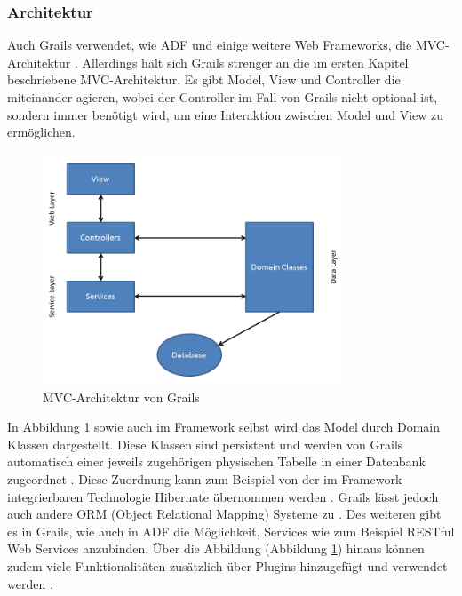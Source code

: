 \subsubsection{Architektur}
Auch Grails verwendet, wie ADF und einige weitere Web Frameworks, die MVC-Architektur \autocite[S.208]{GGR2009}. Allerdings hält sich Grails strenger an die im ersten Kapitel beschriebene MVC-Architektur. Es gibt Model, View und Controller die miteinander agieren, wobei der Controller im Fall von Grails nicht optional ist, sondern immer benötigt wird, um eine Interaktion zwischen Model und View zu ermöglichen\autocite[S.8]{DGG2002}.\\
\begin{figure}[H]
\centering
\includegraphics[width=0.80\textwidth]{img/Folie1.png}
\caption {MVC-Architektur von Grails \autocite[S.220]{GGR2009}}
\label{fig:mvc-grails}
\end{figure}
In Abbildung \ref{fig:mvc-grails} sowie auch im Framework selbst wird das Model durch Domain Klassen dargestellt. Diese Klassen sind persistent und werden von Grails automatisch einer jeweils zugehörigen physischen Tabelle in einer Datenbank zugeordnet \autocite[S.17]{DGG2002}. Diese Zuordnung kann zum Beispiel von der im Framework integrierbaren Technologie Hibernate übernommen werden \autocite[S.18]{DGG2002}. Grails lässt jedoch auch andere ORM (Object Relational Mapping) Systeme zu \autocite{GPO2015}. Des weiteren gibt es in Grails, wie auch in ADF die Möglichkeit, Services wie zum Beispiel RESTful Web Services anzubinden. Über die Abbildung (Abbildung \ref{fig:mvc-grails}) hinaus können zudem viele Funktionalitäten zusätzlich über Plugins hinzugefügt und verwendet werden \autocite[S.3]{DGG2002}.\\

